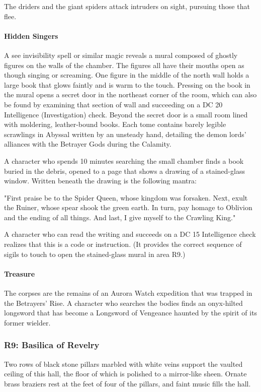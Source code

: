 \documentclass[10pt,a4paper,twoside,twocolumn,openany,nodeprecatedcode]{dndbook}
\begin{document}
The driders and the giant spiders attack intruders on sight, pursuing those that flee.

\paragraph{Hidden Singers}
A see invisibility spell or similar magic reveals a mural composed of ghostly figures on the walls of the chamber. The figures all have their mouths open as though singing or screaming. One figure in the middle of the north wall holds a large book that glows faintly and is warm to the touch. Pressing on the book in the mural opens a secret door in the northeast corner of the room, which can also be found by examining that section of wall and succeeding on a DC 20 Intelligence (Investigation) check. Beyond the secret door is a small room lined with moldering, leather-bound books. Each tome contains barely legible scrawlings in Abyssal written by an unsteady hand, detailing the demon lords' alliances with the Betrayer Gods during the Calamity.

A character who spends 10 minutes searching the small chamber finds a book buried in the debris, opened to a page that shows a drawing of a stained-glass window. Written beneath the drawing is the following mantra:

\begin{DndReadAloud}{}
"First praise be to the Spider Queen, whose kingdom was forsaken. Next, exult the Ruiner, whose spear shook the green earth. In turn, pay homage to Oblivion and the ending of all things. And last, I give myself to the Crawling King."

\end{DndReadAloud}

A character who can read the writing and succeeds on a DC 15 Intelligence check realizes that this is a code or instruction. (It provides the correct sequence of sigils to touch to open the stained-glass mural in area R9.)

\paragraph{Treasure}
The corpses are the remains of an Aurora Watch expedition that was trapped in the Betrayers' Rise. A character who searches the bodies finds an onyx-hilted longsword that has become a Longsword of Vengeance haunted by the spirit of its former wielder.

\subsubsection{R9: Basilica of Revelry}
\begin{DndReadAloud}{}
Two rows of black stone pillars marbled with white veins support the vaulted ceiling of this hall, the floor of which is polished to a mirror-like sheen. Ornate brass braziers rest at the feet of four of the pillars, and faint music fills the hall.

\end{DndReadAloud}
\end{document}
